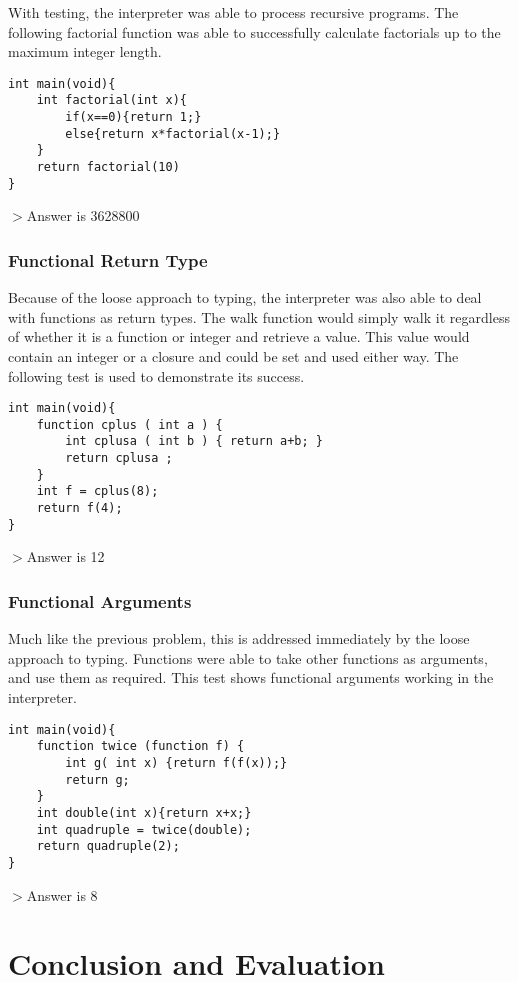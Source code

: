 \documentclass[11pt]{article}
\begin{document}
With testing, the interpreter was able to process recursive programs. The following factorial function was able to successfully calculate factorials up to the maximum integer length.

\begin{lstlisting}
int main(void){
	int factorial(int x){
		if(x==0){return 1;}
		else{return x*factorial(x-1);}
	}
	return factorial(10)
}
\end{lstlisting}
$>$Answer is 3628800
\\

\subsubsection{Functional Return Type}

Because of the loose approach to typing, the interpreter was also able to deal with functions as return types. The walk function would simply walk it regardless of whether it is a function or integer and retrieve a value. This value would contain an integer or a closure and could be set and used either way. The following test is used to demonstrate its success.
\begin{lstlisting}
int main(void){
	function cplus ( int a ) {
		int cplusa ( int b ) { return a+b; }
		return cplusa ;
	}
	int f = cplus(8);
	return f(4);
}
\end{lstlisting}
$>$Answer is 12

\subsubsection{Functional Arguments}

Much like the previous problem, this is addressed immediately by the loose approach to typing. Functions were able to take other functions as arguments, and use them as required. This test shows functional arguments working in the interpreter. 

\begin{lstlisting}
int main(void){
    function twice (function f) {
        int g( int x) {return f(f(x));}
        return g;
    }
    int double(int x){return x+x;}
    int quadruple = twice(double);
    return quadruple(2);
}
\end{lstlisting}
$>$Answer is 8

\section{Conclusion and Evaluation}
\end{document}
